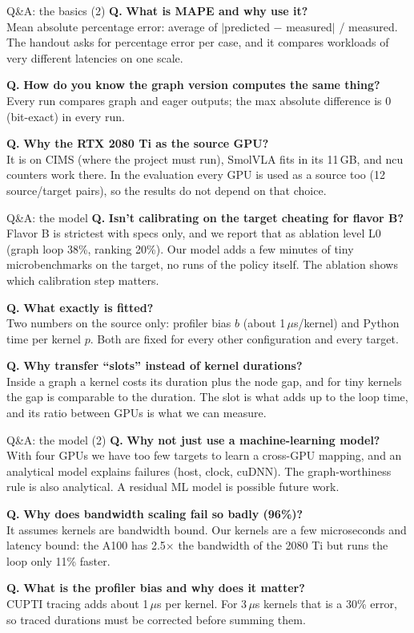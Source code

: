 \documentclass[aspectratio=169,10pt]{beamer}
\newcommand{\qa}[2]{\textbf{\textcolor{accent}{Q.}} \textbf{#1}\\[0.2em]{\small #2}\par\medskip}
\begin{document}
\begin{frame}{Q\&A: the basics (2)}
\qa{What is MAPE and why use it?}{Mean absolute percentage error: average of
$|$predicted $-$ measured$|$ / measured. The handout asks for percentage error per case, and it
compares workloads of very different latencies on one scale.}
\qa{How do you know the graph version computes the same thing?}{Every run compares graph and
eager outputs; the max absolute difference is 0 (bit-exact) in every run.}
\qa{Why the RTX 2080 Ti as the source GPU?}{It is on CIMS (where the project must run), SmolVLA
fits in its 11\,GB, and ncu counters work there. In the evaluation every GPU is used as a
source too (12 source/target pairs), so the results do not depend on that choice.}
\end{frame}

\begin{frame}{Q\&A: the model}
\qa{Isn't calibrating on the target cheating for flavor B?}{Flavor B is strictest with specs
only, and we report that as ablation level L0 (graph loop 38\%, ranking 20\%). Our model adds a
few minutes of tiny microbenchmarks on the target, no runs of the policy itself. The ablation
shows which calibration step matters.}
\qa{What exactly is fitted?}{Two numbers on the source only: profiler bias $b$ (about
1\,$\mu$s/kernel) and Python time per kernel $p$. Both are fixed for every other configuration
and every target.}
\qa{Why transfer ``slots'' instead of kernel durations?}{Inside a graph a kernel costs its
duration plus the node gap, and for tiny kernels the gap is comparable to the duration. The
slot is what adds up to the loop time, and its ratio between GPUs is what we can measure.}
\end{frame}

\begin{frame}{Q\&A: the model (2)}
\qa{Why not just use a machine-learning model?}{With four GPUs we have too few targets to learn
a cross-GPU mapping, and an analytical model explains failures (host, clock, cuDNN). The
graph-worthiness rule is also analytical. A residual ML model is possible future work.}
\qa{Why does bandwidth scaling fail so badly (96\%)?}{It assumes kernels are bandwidth bound.
Our kernels are a few microseconds and latency bound: the A100 has 2.5$\times$ the bandwidth of
the 2080 Ti but runs the loop only 11\% faster.}
\qa{What is the profiler bias and why does it matter?}{CUPTI tracing adds about 1\,$\mu$s per
kernel. For 3\,$\mu$s kernels that is a 30\% error, so traced durations must be corrected before
summing them.}
\end{frame}
\end{document}
